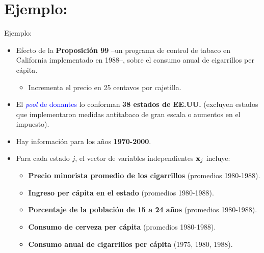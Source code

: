 \documentclass[10pt, xcolor=dvipsnames]{beamer}
\begin{document}
\section[Ejemplo: Abadie et al. (2010)]{Ejemplo: \texorpdfstring{\citet{abadie2010}}{Abadie et al. (2010)}}

\begin{frame}{Ejemplo: \texorpdfstring{\citet{abadie2010}}{Abadie et al. (2010)}}
\begin{itemize}\setlength{\itemsep}{1em}
    \item Efecto de la \textbf{Proposición 99} --un programa de control de tabaco en California implementado en 1988--, sobre el consumo anual de cigarrillos per cápita.
    \vspace{0.4em}    
    \begin{itemize}
        \item Incrementa el precio en 25 centavos por cajetilla.
    \end{itemize}    
    \pause
    \item El \textcolor{blue}{\textit{pool} de donantes} lo conforman \textbf{38 estados de EE.UU.} (excluyen estados que implementaron medidas antitabaco de gran escala o aumentos en el impuesto). %
    \item Hay información para los años \textbf{1970-2000}.    
    \pause
    \item Para cada estado $j$, el vector de variables independientes $\textbf{x}_j$ incluye:
    \vspace{0.4em}
    \begin{itemize}
    \fontvid
        \item \textbf{Precio minorista promedio de los cigarrillos} (promedios 1980-1988).
        \item \textbf{Ingreso per cápita en el estado} (promedios 1980-1988).
        \item \textbf{Porcentaje de la población de 15 a 24 años} (promedios 1980-1988).
        \item \textbf{Consumo de cerveza per cápita} (promedios 1980-1988).
        \item \textbf{Consumo anual de cigarrillos per cápita} (1975, 1980, 1988).   
    \end{itemize}
\end{itemize}
\end{frame}
\end{document}
